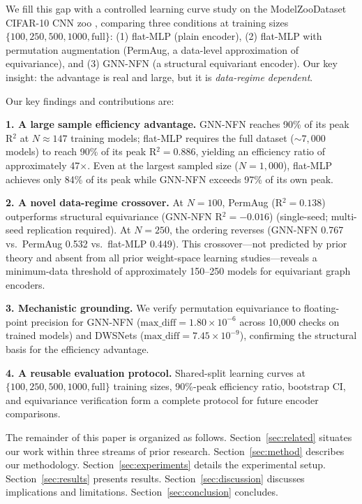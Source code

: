 We fill this gap with a controlled learning curve study on the ModelZooDataset CIFAR-10 CNN zoo \cite{Schurholt2022Model}, comparing three conditions at training sizes $\{100, 250, 500, 1000, \text{full}\}$: (1) flat-MLP (plain encoder), (2) flat-MLP with permutation augmentation (PermAug, a data-level approximation of equivariance), and (3) GNN-NFN (a structural equivariant encoder). Our key insight: the advantage is real and large, but it is \emph{data-regime dependent}.

Our key findings and contributions are:

\textbf{1. A large sample efficiency advantage.} GNN-NFN reaches 90\% of its peak R$^2$ at $N{\approx}147$ training models; flat-MLP requires the full dataset (${\sim}7{,}000$ models) to reach 90\% of its peak R$^2{=}0.886$, yielding an efficiency ratio of approximately 47$\times$. Even at the largest sampled size ($N{=}1{,}000$), flat-MLP achieves only 84\% of its peak while GNN-NFN exceeds 97\% of its own peak.

\textbf{2. A novel data-regime crossover.} At $N{=}100$, PermAug (R$^2{=}0.138$) outperforms structural equivariance (GNN-NFN R$^2{=}{-}0.016$) (single-seed; multi-seed replication required). At $N{=}250$, the ordering reverses (GNN-NFN 0.767 vs.\ PermAug 0.532 vs.\ flat-MLP 0.449). This crossover---not predicted by prior theory and absent from all prior weight-space learning studies---reveals a minimum-data threshold of approximately 150--250 models for equivariant graph encoders.

\textbf{3. Mechanistic grounding.} We verify permutation equivariance to floating-point precision for GNN-NFN ($\text{max\_diff}{=}1.80{\times}10^{-6}$ across 10,000 checks on trained models) and DWSNets ($\text{max\_diff}{=}7.45{\times}10^{-9}$), confirming the structural basis for the efficiency advantage.

\textbf{4. A reusable evaluation protocol.} Shared-split learning curves at $\{100, 250, 500, 1000, \text{full}\}$ training sizes, 90\%-peak efficiency ratio, bootstrap CI, and equivariance verification form a complete protocol for future encoder comparisons.

The remainder of this paper is organized as follows. Section~\ref{sec:related} situates our work within three streams of prior research. Section~\ref{sec:method} describes our methodology. Section~\ref{sec:experiments} details the experimental setup. Section~\ref{sec:results} presents results. Section~\ref{sec:discussion} discusses implications and limitations. Section~\ref{sec:conclusion} concludes.
